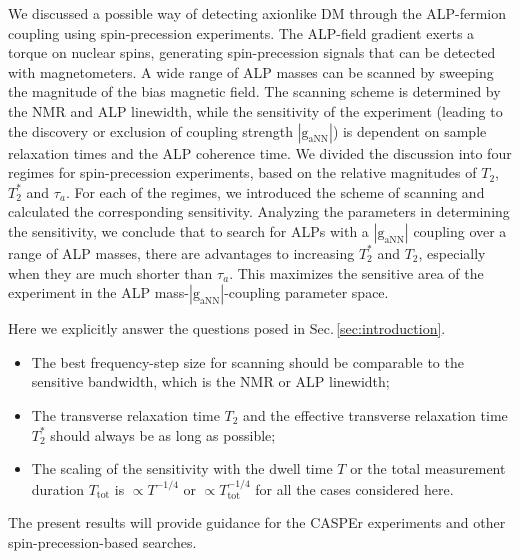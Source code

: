 We discussed a possible way of detecting axionlike DM through the ALP-fermion coupling using spin-precession experiments. The ALP-field gradient exerts a torque on nuclear spins, generating spin-precession signals that can be detected with magnetometers. 
A wide range of ALP masses can be scanned by sweeping the magnitude of the bias magnetic field. 
The scanning scheme is determined by the NMR and ALP linewidth, while the sensitivity of the experiment (leading to the discovery or exclusion of coupling strength $|\mathrm{g_{aNN}}|$) is dependent on sample relaxation times and the ALP coherence time. We divided the discussion into four regimes for spin-precession experiments, based on the relative magnitudes of $T_2$, $T_2^*$ and $\tau_a$. For each of the regimes, we introduced the scheme of scanning and calculated the corresponding sensitivity. 
Analyzing the parameters in determining the sensitivity, we conclude that to search for ALPs with a $|\mathrm{g_{aNN}}|$ coupling over a range of ALP masses, there are advantages to increasing $T_2^*$ and $T_2$, especially when they are much shorter than $\tau_a$. This maximizes the sensitive area of the experiment in the ALP mass-$|\mathrm{g_{aNN}}|$-coupling parameter space. 

Here we explicitly answer the questions posed in Sec.\,\ref{sec:introduction}.

\begin{itemize}
    \item The best frequency-step size for scanning should be comparable to the sensitive bandwidth, which is the NMR or ALP linewidth;
    \item The transverse relaxation time $T_2$ and the effective transverse relaxation time $T_2^*$ should always be as long as possible;
    \item The scaling of the sensitivity with the dwell time $T$ or the total measurement duration $T_{\mathrm{tot}}$ is $\propto T^{-1/4}$ or $\propto T_{\mathrm{tot}}^{-1/4}$ for all the cases considered here.
\end{itemize}

The present results will provide guidance for the CASPEr experiments and other spin-precession-based searches.







